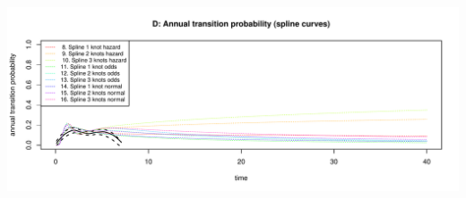 \documentclass[
]{article}
\begin{document}
\begin{flushleft}\includegraphics[height=0.29\textheight]{Images/validate_extrapolation2-4} \end{flushleft}

\begin{table}


\end{table}
\end{document}

